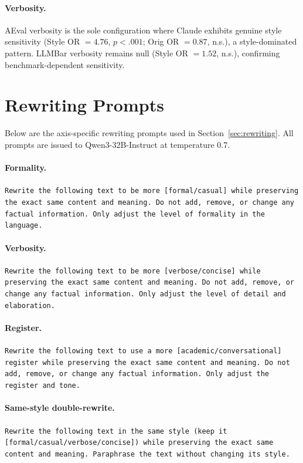 \paragraph{Verbosity.}
AEval verbosity is the sole configuration where Claude exhibits genuine style sensitivity (Style OR $= 4.76$, $p < .001$; Orig OR $= 0.87$, n.s.), a style-dominated pattern.
LLMBar verbosity remains null (Style OR $= 1.52$, n.s.), confirming benchmark-dependent sensitivity.

\section{Rewriting Prompts}
\label{app:rewriting_prompts}

Below are the axis-specific rewriting prompts used in Section~\ref{sec:rewriting}. All prompts are issued to Qwen3-32B-Instruct at temperature 0.7.

\paragraph{Formality.}
\texttt{Rewrite the following text to be more [formal/casual] while preserving the exact same content and meaning. Do not add, remove, or change any factual information. Only adjust the level of formality in the language.}

\paragraph{Verbosity.}
\texttt{Rewrite the following text to be more [verbose/concise] while preserving the exact same content and meaning. Do not add, remove, or change any factual information. Only adjust the level of detail and elaboration.}

\paragraph{Register.}
\texttt{Rewrite the following text to use a more [academic/conversational] register while preserving the exact same content and meaning. Do not add, remove, or change any factual information. Only adjust the register and tone.}

\paragraph{Same-style double-rewrite.}
\texttt{Rewrite the following text in the same style (keep it [formal/casual/verbose/concise]) while preserving the exact same content and meaning. Paraphrase the text without changing its style.}

